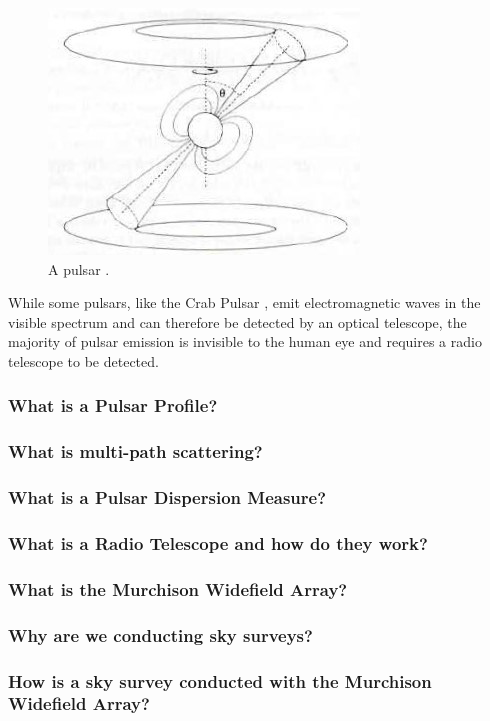 \documentclass{article}
\begin{document}
\begin{figure}[h!]
    \centering
    \includegraphics{pulsar.jpg}
    \caption{A pulsar \autocite{maoz}.}
    \label{fig:pulsar1}
\end{figure}

While some pulsars, like the Crab Pulsar \autocite{maoz}, emit electromagnetic waves in the visible spectrum and can therefore be detected by an optical telescope, the majority of pulsar emission is invisible to the human eye and requires a radio telescope to be detected.

\subsubsection{What is a Pulsar Profile?}
\subsubsection{What is multi-path scattering?}
\subsubsection{What is a Pulsar Dispersion Measure?}
\subsubsection{What is a Radio Telescope and how do they work?}
\subsubsection{What is the Murchison Widefield Array?}
\subsubsection{Why are we conducting sky surveys?}
\subsubsection{How is a sky survey conducted with the Murchison Widefield Array?}
\end{document}
